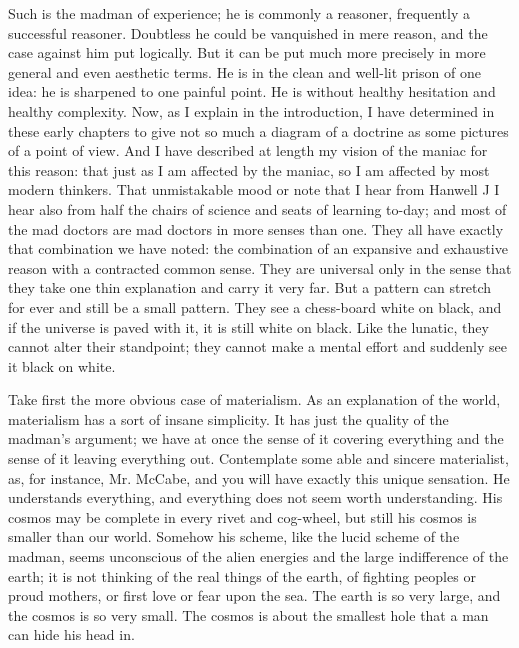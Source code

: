 \documentclass{book}
\begin{document}
Such is the madman of experience; he is commonly a reasoner, frequently a successful reasoner. Doubtless he could be vanquished in mere reason, and the case against him put logically. But it can be put much more precisely in more general and even aesthetic terms. He is in the clean and well-lit prison of one idea: he is sharpened to one painful point. He is without healthy hesitation and healthy complexity. Now, as I explain in the introduction, I have determined in these early chapters to give not so much a diagram of a doctrine as some pictures of a point of view. And I have described at length my vision of the maniac for this reason: that just as I am affected by the maniac, so I am affected by most modern thinkers. That unmistakable mood or note that I hear from Hanwell J I hear also from half the chairs of science and seats of learning to-day; and most of the mad doctors are mad doctors in more senses than one. They all have exactly that combination we have noted: the combination of an expansive and exhaustive reason with a contracted common sense. They are universal only in the sense that they take one thin explanation and carry it very far. But a pattern can stretch for ever and still be a small pattern. They see a chess-board white on black, and if the universe is paved with it, it is still white on black. Like the lunatic, they cannot alter their standpoint; they cannot make a mental effort and suddenly see it black on white.

Take first the more obvious case of materialism. As an explanation of the world, materialism has a sort of insane simplicity. It has just the quality of the madman’s argument; we have at once the sense of it covering everything and the sense of it leaving everything out. Contemplate some able and sincere materialist, as, for instance, Mr. McCabe, and you will have exactly this unique sensation. He understands everything, and everything does not seem worth understanding. His cosmos may be complete in every rivet and cog-wheel, but still his cosmos is smaller than our world. Somehow his scheme, like the lucid scheme of the madman, seems unconscious of the alien energies and the large indifference of the earth; it is not thinking of the real things of the earth, of fighting peoples or proud mothers, or first love or fear upon the sea. The earth is so very large, and the cosmos is so very small. The cosmos is about the smallest hole that a man can hide his head in.
\end{document}
